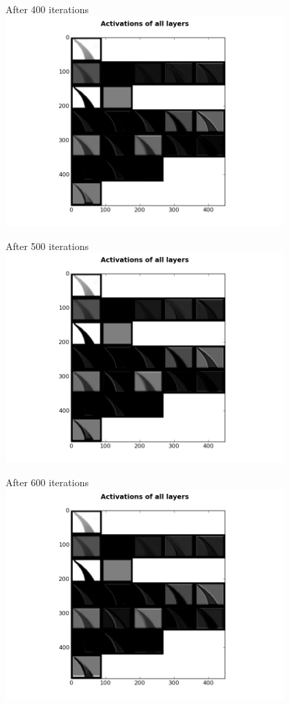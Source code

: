 \begin{frame}{After 400 iterations}
\includegraphics[height=8.0cm]{data/activations/output-400.png}\\ 
\end{frame}

\begin{frame}{After 500 iterations}
\includegraphics[height=8.0cm]{data/activations/output-500.png}\\ 
\end{frame}

\begin{frame}{After 600 iterations}
\includegraphics[height=8.0cm]{data/activations/output-600.png}\\ 
\end{frame}

